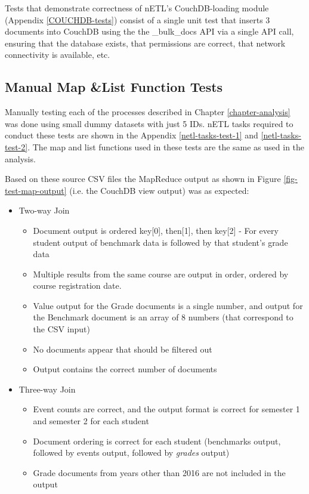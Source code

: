 Tests that demonstrate correctness of nETL's CouchDB-loading module (Appendix \ref{COUCHDB-tests}) consist of a single unit test that inserts 3 documents into CouchDB using the the \_bulk\_docs API via a single API call, ensuring that the database exists, that permissions are correct, that network connectivity is available, etc.

\subsection{Manual Map \&List Function Tests}
Manually testing each of the processes described in Chapter \ref{chapter-analysis} was done using small dummy datasets with just 5 IDs. nETL tasks required to conduct these tests are shown in the Appendix \ref{netl-tasks-test-1} and \ref{netl-tasks-test-2}. The map and list functions used in these tests are the same as used in the analysis.

Based on these source CSV files the MapReduce output as shown in Figure \ref{fig-test-map-output} (i.e. the CouchDB view output) was as expected:

\begin{itemize}
  \item Two-way Join
        \begin{itemize}
          \item Document output is ordered key[0], then[1], then key[2] - For every student output of benchmark data is followed by that student's grade data
          \item Multiple results from the same course are output in order, ordered by course registration date.
          \item Value output for the Grade documents is a single number, and output for the Benchmark document is an array of 8 numbers (that correspond to the CSV input)
          \item No documents appear that should be filtered out
          \item Output contains the correct number of documents
        \end{itemize}
  \item Three-way Join
        \begin{itemize}
          \item Event counts are correct, and the output format is correct for semester 1 and semester 2 for each student
          \item Document ordering is correct for each student (benchmarks output, followed by events output, followed by \textit{grades} output)
          \item Grade documents from years other than 2016 are not included in the output
        \end{itemize}
\end{itemize}

